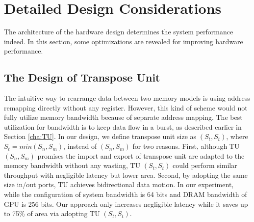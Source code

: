 \documentclass[10pt,journal,compsoc]{IEEEtran}
\begin{document}
\section{Detailed Design Considerations}
\label{cha:Advanced}
The architecture of the hardware design determines the system performance indeed. In this section, some optimizations are revealed for improving hardware performance.

\subsection{The Design of Transpose Unit}

The intuitive way to rearrange data between two memory models is using address remapping directly without any register.
However, this kind of scheme would not fully utilize memory bandwidth because of separate address mapping.
The best utilization for bandwidth is to keep data flow in a burst, as described earlier in Section  \ref{cha:TU}.
In our design,  we define transpose unit size as  $  (S_{t}, S_{t}) $, where $S_{t} =min(S_{n},S_{m})$, instead of $  (S_{n}, S_{m}) $ for two reasons.
First, although TU $ (S_{n}, S_{m}) $ promises the import and export of transpose unit are adapted to the memory bandwidth without any wasting, TU $  (S_{t}, S_{t}) $ could perform similar throughput with negligible latency but lower area.
Second, by adopting the same size in/out ports,
TU achieves bidirectional data motion.
In our experiment, while the configuration of system bandwidth is 64 bits and DRAM bandwidth of GPU is 256 bits.
Our approach only increases negligible latency while it saves up to 75\% of area via adopting  TU $  (S_{t}, S_{t}) $.
\end{document}
